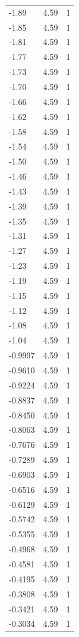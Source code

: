 \begin{longtable}{lrr}
  -1.89 & 4.59 & 1 \\
  -1.85 & 4.59 & 1 \\
  -1.81 & 4.59 & 1 \\
  -1.77 & 4.59 & 1 \\
  -1.73 & 4.59 & 1 \\
  -1.70 & 4.59 & 1 \\
  -1.66 & 4.59 & 1 \\
  -1.62 & 4.59 & 1 \\
  -1.58 & 4.59 & 1 \\
  -1.54 & 4.59 & 1 \\
  -1.50 & 4.59 & 1 \\
  -1.46 & 4.59 & 1 \\
  -1.43 & 4.59 & 1 \\
  -1.39 & 4.59 & 1 \\
  -1.35 & 4.59 & 1 \\
  -1.31 & 4.59 & 1 \\
  -1.27 & 4.59 & 1 \\
  -1.23 & 4.59 & 1 \\
  -1.19 & 4.59 & 1 \\
  -1.15 & 4.59 & 1 \\
  -1.12 & 4.59 & 1 \\
  -1.08 & 4.59 & 1 \\
  -1.04 & 4.59 & 1 \\
  -0.9997 & 4.59 & 1 \\
  -0.9610 & 4.59 & 1 \\
  -0.9224 & 4.59 & 1 \\
  -0.8837 & 4.59 & 1 \\
  -0.8450 & 4.59 & 1 \\
  -0.8063 & 4.59 & 1 \\
  -0.7676 & 4.59 & 1 \\
  -0.7289 & 4.59 & 1 \\
  -0.6903 & 4.59 & 1 \\
  -0.6516 & 4.59 & 1 \\
  -0.6129 & 4.59 & 1 \\
  -0.5742 & 4.59 & 1 \\
  -0.5355 & 4.59 & 1 \\
  -0.4968 & 4.59 & 1 \\
  -0.4581 & 4.59 & 1 \\
  -0.4195 & 4.59 & 1 \\
  -0.3808 & 4.59 & 1 \\
  -0.3421 & 4.59 & 1 \\
  -0.3034 & 4.59 & 1 \\

\end{longtable}
